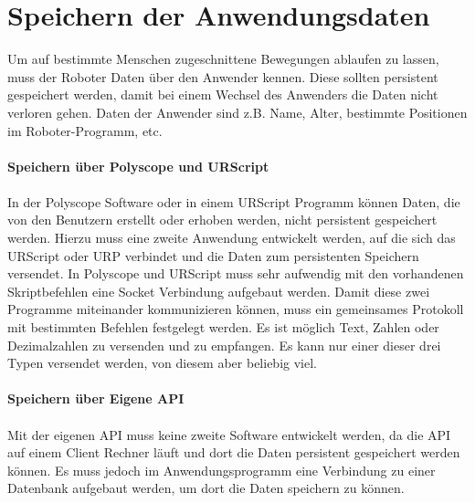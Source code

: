 \section{Speichern der Anwendungsdaten}
\label{sec:save_of_data_kon}

Um auf bestimmte Menschen zugeschnittene Bewegungen ablaufen zu lassen, muss der Roboter Daten über den Anwender kennen. Diese sollten persistent gespeichert werden, damit bei einem Wechsel des Anwenders die Daten nicht verloren gehen.
Daten der Anwender sind z.B. Name, Alter, bestimmte Positionen im Roboter-Programm, etc.
\\\\
\textbf{Speichern über Polyscope und URScript}
\label{sec:save_data_polyscope_kon}
\\\\
In der Polyscope Software oder in einem URScript Programm können Daten, die von den Benutzern erstellt oder erhoben werden, nicht persistent
gespeichert werden. Hierzu muss eine zweite Anwendung entwickelt werden, auf die sich das URScript oder \ac{URP} verbindet und die Daten zum persistenten Speichern versendet.
In Polyscope und URScript muss sehr aufwendig mit den vorhandenen Skriptbefehlen eine Socket Verbindung aufgebaut werden.
Damit diese zwei Programme miteinander kommunizieren können, muss ein gemeinsames Protokoll mit bestimmten Befehlen festgelegt werden. Es ist möglich Text, Zahlen oder Dezimalzahlen zu versenden und zu empfangen. Es kann nur einer dieser drei Typen versendet werden, von diesem aber beliebig viel. 
\\\\
\textbf{Speichern über Eigene API}
\label{save_data_own_api_kon}
\\\\
Mit der eigenen \ac{API} muss keine zweite Software entwickelt werden, da die \ac{API} auf einem Client Rechner läuft und dort die Daten persistent gespeichert werden können. Es muss jedoch im Anwendungsprogramm eine Verbindung zu einer Datenbank aufgebaut werden, um dort die Daten speichern zu können.